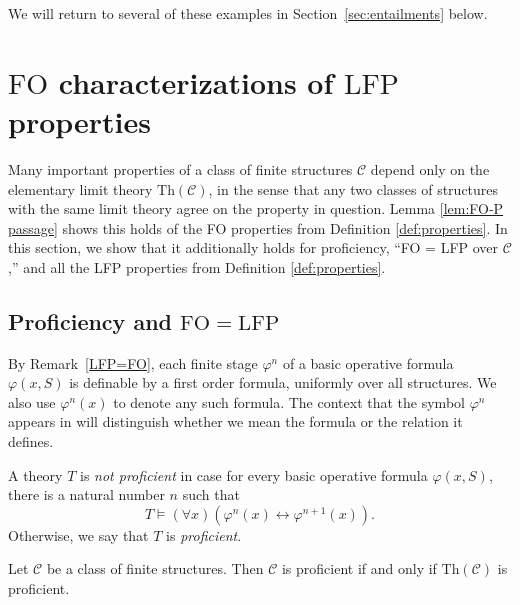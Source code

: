\documentclass{lmcs}
\newcommand{\Th}{\mathrm{Th}}
\newcommand{\LFP}{\mathrm{LFP}}
\newcommand{\FO}{\mathrm{FO}}
\theoremstyle{thmC}
\begin{document}
We will return to several of these examples in Section~\ref{sec:entailments} below. 


\section{\texorpdfstring{$\FO$}{FO} characterizations of \texorpdfstring{$\LFP$}{LFP} properties}\label{sec:Proficiency-sOP}
Many important properties of a class of finite structures $\mathcal{C}$ depend only on the elementary limit theory $\Th(\mathcal{C})$, in the sense that any two classes of structures with the same limit theory agree on the property in question. Lemma \ref{lem:FO-P passage} shows this holds of the FO properties from Definition \ref{def:properties}. In this section, we show that it additionally holds for proficiency, ``FO = LFP over $\mathcal{C}$,'' and all the LFP properties from Definition \ref{def:properties}.


\subsection{Proficiency and \texorpdfstring{$\FO = \LFP$}{FO = LFP}}

By Remark~\ref{LFP=FO}, each finite stage $\varphi^n$ of a basic operative formula $\varphi(x,S)$ is definable by a first order formula, uniformly over all structures. We also use $\varphi^n(x)$ to denote any such formula. The context that the symbol $\varphi^n$ appears in will distinguish whether we mean the formula or the relation it defines.

\begin{defi}
A theory $T$ is \emph{not proficient} in case for every basic operative formula $\varphi(x,S)$, there is a natural number $n$ such that \[ T \models (\forall x)(\varphi^n(x) \leftrightarrow \varphi^{n+1}(x)).\]
Otherwise, we say that $T$ is \emph{proficient}.
\end{defi}


\begin{lem}\label{lem:Steve's-2}
Let $\mathcal{C}$ be a class of finite structures. Then $\mathcal{C}$ is proficient if and only if $\mathrm{Th}(\mathcal{C})$ is proficient.
\end{lem}
\end{document}
